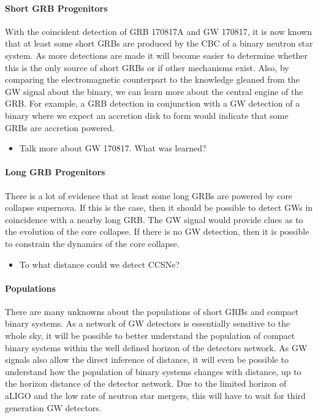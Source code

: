 \documentclass[11pt]{cuthesis}
\begin{document}
\paragraph{Short GRB Progenitors}
With the coincident detection of GRB 170817A and GW 170817, it is now known that at least some short GRBs are produced by the CBC of a binary neutron star system. As more detections are made it will become easier to determine whether this is the only source of short GRBs or if other mechanisms exist. Also, by comparing the electromagnetic counterpart to the knowledge gleaned from the GW signal about the binary, we can learn more about the central engine of the GRB. For example, a GRB detection in conjunction with a GW detection of a binary where we expect an accretion disk to form would indicate that some GRBs are accretion powered.

\begin{itemize}
\item Talk more about GW 170817. What was learned?
\end{itemize} 

\paragraph{Long GRB Progenitors}
There is a lot of evidence that at least some long GRBs are powered by core collapse supernova. If this is the case, then it should be possible to detect GWs in coincidence with a nearby long GRB. The GW signal would provide clues as to the evolution of the core collapse. If there is no GW detection, then it is possible to constrain the dynamics of the core collapse. 

\begin{itemize}
\item To what distance could we detect CCSNe?
\end{itemize}

\paragraph{Populations}
There are many unknowns about the populations of short GRBs and compact binary systems. As a network of GW detectors is essentially sensitive to the whole sky, it will be possible to better understand the population of compact binary systems within the well defined horizon of the detectors network. As GW signals also allow the direct inference of distance, it will even be possible to understand how the population of binary systems changes with distance, up to the horizon distance of the detector network. Due to the limited horizon of aLIGO and the low rate of neutron star mergers, this will have to wait for third generation GW detectors.
\end{document}
